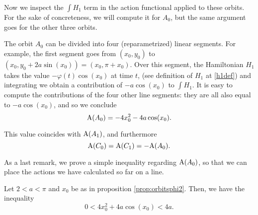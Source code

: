 Now we inspect the $\int H_1$ term in the action functional applied to these orbits. For the sake of concreteness, we will compute it for $A_0$, but the same argument goes for the other three orbits.

The orbit $A_0$ can be divided into four (reparametrized) linear segments. For example, the first segment goes from $(x_0, y_0)$ to $(x_0, y_0 + 2a \sin(x_0)) = (x_0, \pi + x_0)$. Over this segment, the Hamiltonian $H_1$ takes the value $- \varphi(t) \cos(x_0)$ at time $t$, (see definition of $H_1$ at \eqref{h1def}) and integrating we obtain a contribution of $- a \cos(x_0)$ to $\int H_1$. It is easy to compute the contributions of the four other line segments: they are all also equal to $- a \cos(x_0)$, and so we conclude
\begin{equation}
\AA(A_0) = - 4 x_0^2 - 4 a \cos(x_0).
\end{equation}

This value coincides with $\AA(A_1)$, and furthermore
\begin{equation}
\AA(C_0) = \AA(C_1) = - \AA(A_0).
\end{equation}

As a last remark, we prove a simple inequality regarding $\AA(A_0)$, so that we can place the actions we have calculated so far on a line.

\begin{prop}\label{prop:ineq4beta}
Let $2 < a < \pi$ and $x_0$ be as in proposition \ref{prop:orbitsphi2}. Then, we have the inequality
\begin{equation}
0 < 4 x_0^2 + 4 a \cos(x_0) < 4a.
\end{equation}
\end{prop}

